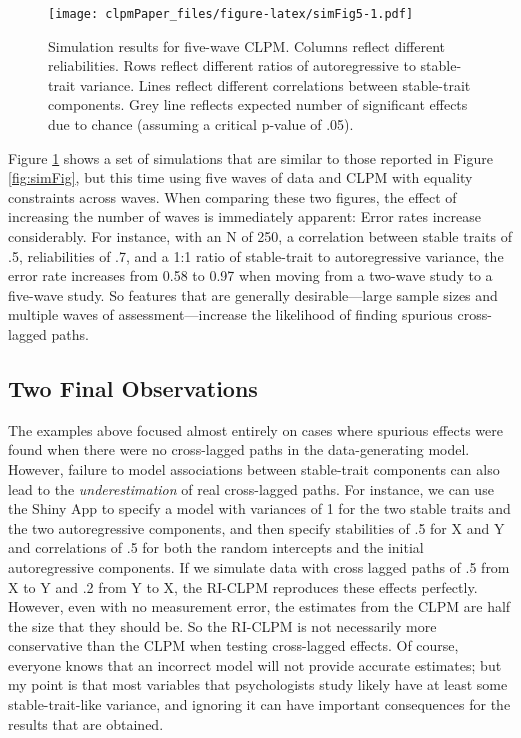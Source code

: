 \documentclass[
  english,
  man,floatsintext]{apa6}
\begin{document}
\begin{figure}
\centering
\texttt{[image: clpmPaper\_files/figure-latex/simFig5-1.pdf]}
\caption{\label{fig:simFig5}Simulation results for five-wave CLPM. Columns reflect different reliabilities. Rows reflect different ratios of autoregressive to stable-trait variance. Lines reflect different correlations between stable-trait components. Grey line reflects expected number of significant effects due to chance (assuming a critical p-value of .05).}
\end{figure}

Figure \ref{fig:simFig5} shows a set of simulations that are similar to those reported in Figure \ref{fig:simFig}, but this time using five waves of data and CLPM with equality constraints across waves. When comparing these two figures, the effect of increasing the number of waves is immediately apparent: Error rates increase considerably. For instance, with an N of 250, a correlation between stable traits of .5, reliabilities of .7, and a 1:1 ratio of stable-trait to autoregressive variance, the error rate increases from 0.58 to 0.97 when moving from a two-wave study to a five-wave study. So features that are generally desirable---large sample sizes and multiple waves of assessment---increase the likelihood of finding spurious cross-lagged paths.

\hypertarget{two-final-observations}{%
\subsection{Two Final Observations}\label{two-final-observations}}

The examples above focused almost entirely on cases where spurious effects were found when there were no cross-lagged paths in the data-generating model. However, failure to model associations between stable-trait components can also lead to the \emph{underestimation} of real cross-lagged paths. For instance, we can use the Shiny App to specify a model with variances of 1 for the two stable traits and the two autoregressive components, and then specify stabilities of .5 for X and Y and correlations of .5 for both the random intercepts and the initial autoregressive components. If we simulate data with cross lagged paths of .5 from X to Y and .2 from Y to X, the RI-CLPM reproduces these effects perfectly. However, even with no measurement error, the estimates from the CLPM are half the size that they should be. So the RI-CLPM is not necessarily more conservative than the CLPM when testing cross-lagged effects. Of course, everyone knows that an incorrect model will not provide accurate estimates; but my point is that most variables that psychologists study likely have at least some stable-trait-like variance, and ignoring it can have important consequences for the results that are obtained.
\end{document}
